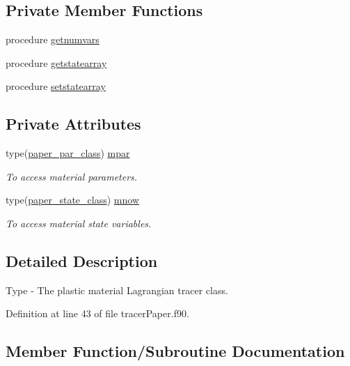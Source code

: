 \subsection*{Private Member Functions}
\begin{DoxyCompactItemize}
\item 
procedure \mbox{\hyperlink{structtracerpaper__mod_1_1paper__class_a0ba29c27901f4604afa1fbf3c0dc3ca8}{getnumvars}}
\item 
procedure \mbox{\hyperlink{structtracerpaper__mod_1_1paper__class_a21d6ed82c83e42c34957d7e7d6013b60}{getstatearray}}
\item 
procedure \mbox{\hyperlink{structtracerpaper__mod_1_1paper__class_aceade1b3528c222d5633f1c7e26df2dc}{setstatearray}}
\end{DoxyCompactItemize}
\subsection*{Private Attributes}
\begin{DoxyCompactItemize}
\item 
type(\mbox{\hyperlink{structtracerpaper__mod_1_1paper__par__class}{paper\+\_\+par\+\_\+class}}) \mbox{\hyperlink{structtracerpaper__mod_1_1paper__class_a26cdff9536d77341f4c2d815400a7a86}{mpar}}
\begin{DoxyCompactList}\small\item\em To access material parameters. \end{DoxyCompactList}\item 
type(\mbox{\hyperlink{structtracerpaper__mod_1_1paper__state__class}{paper\+\_\+state\+\_\+class}}) \mbox{\hyperlink{structtracerpaper__mod_1_1paper__class_a737a7e41a12ed99f6d3deaddc0a07554}{mnow}}
\begin{DoxyCompactList}\small\item\em To access material state variables. \end{DoxyCompactList}\end{DoxyCompactItemize}


\subsection{Detailed Description}
Type -\/ The plastic material Lagrangian tracer class. 

Definition at line 43 of file tracer\+Paper.\+f90.



\subsection{Member Function/\+Subroutine Documentation}
\mbox{\label{structtracerpaper__mod_1_1paper__class_a0ba29c27901f4604afa1fbf3c0dc3ca8}} 

